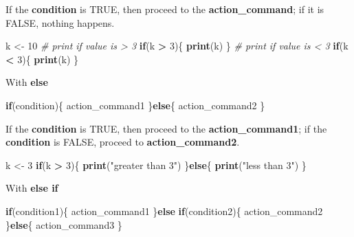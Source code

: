 \documentclass[]{book}
\newenvironment{Shaded}{\begin{snugshade}}{\end{snugshade}}
\newcommand{\CommentTok}[1]{\textcolor[rgb]{0.56,0.35,0.01}{\textit{#1}}}
\newcommand{\ControlFlowTok}[1]{\textcolor[rgb]{0.13,0.29,0.53}{\textbf{#1}}}
\newcommand{\DecValTok}[1]{\textcolor[rgb]{0.00,0.00,0.81}{#1}}
\newcommand{\KeywordTok}[1]{\textcolor[rgb]{0.13,0.29,0.53}{\textbf{#1}}}
\newcommand{\NormalTok}[1]{#1}
\newcommand{\OperatorTok}[1]{\textcolor[rgb]{0.81,0.36,0.00}{\textbf{#1}}}
\newcommand{\StringTok}[1]{\textcolor[rgb]{0.31,0.60,0.02}{#1}}
\begin{document}
If the \textbf{condition} is TRUE, then proceed to the \textbf{action\_command}; if it is FALSE, nothing happens.

\begin{Shaded}
\begin{Highlighting}[]
\NormalTok{k <-}\StringTok{ }\DecValTok{10}
\CommentTok{# print if value is > 3}
\ControlFlowTok{if}\NormalTok{(k }\OperatorTok{>}\StringTok{ }\DecValTok{3}\NormalTok{)\{}
  \KeywordTok{print}\NormalTok{(k)}
\NormalTok{\}}
\CommentTok{# print if value is < 3}
\ControlFlowTok{if}\NormalTok{(k }\OperatorTok{<}\StringTok{ }\DecValTok{3}\NormalTok{)\{}
  \KeywordTok{print}\NormalTok{(k)}
\NormalTok{\}}
\end{Highlighting}
\end{Shaded}

With \textbf{else}

\begin{Shaded}
\begin{Highlighting}[]
\ControlFlowTok{if}\NormalTok{(condition)\{}
\NormalTok{    action_command1}
\NormalTok{\}}\ControlFlowTok{else}\NormalTok{\{}
\NormalTok{    action_command2}
\NormalTok{\}}
\end{Highlighting}
\end{Shaded}

If the \textbf{condition} is TRUE, then proceed to the \textbf{action\_command1}; if the \textbf{condition} is FALSE, proceed to \textbf{action\_command2}.

\begin{Shaded}
\begin{Highlighting}[]
\NormalTok{k <-}\StringTok{ }\DecValTok{3}
\ControlFlowTok{if}\NormalTok{(k }\OperatorTok{>}\StringTok{ }\DecValTok{3}\NormalTok{)\{}
  \KeywordTok{print}\NormalTok{(}\StringTok{"greater than 3"}\NormalTok{)}
\NormalTok{\}}\ControlFlowTok{else}\NormalTok{\{}
  \KeywordTok{print}\NormalTok{(}\StringTok{"less than 3"}\NormalTok{)}
\NormalTok{\}}
\end{Highlighting}
\end{Shaded}

With \textbf{else if}

\begin{Shaded}
\begin{Highlighting}[]
\ControlFlowTok{if}\NormalTok{(condition1)\{}
\NormalTok{    action_command1}
\NormalTok{\}}\ControlFlowTok{else} \ControlFlowTok{if}\NormalTok{(condition2)\{}
\NormalTok{    action_command2}
\NormalTok{\}}\ControlFlowTok{else}\NormalTok{\{}
\NormalTok{    action_command3}
\NormalTok{\}}
\end{Highlighting}
\end{Shaded}
\end{document}
